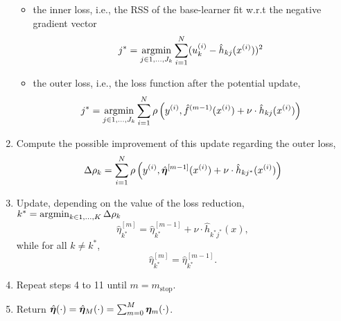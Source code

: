 \begin{algorithm}
\begin{enumerate}
\begin{itemize}
            \item the inner loss, i.e., the RSS of the base-learner fit w.r.t the negative gradient vector
                \begin{equation}
                    j^*=\operatorname*{argmin}_{j\in 1,\ldots,J_k}\sum_{i=1}^N(u_k^{(i)}-\hat{h}_{kj}(x^{(i)}))^2
                \end{equation}
            \item the outer loss, i.e., the loss function after the potential update,
                \begin{equation}
                    j^*=\operatorname*{argmin}_{j\in 1,\ldots,J_k}\sum_{i=1}^N\rho\left(y^{(i)}, \hat{f}^{(m-1)}(x^{(i)}) + \nu \cdot \hat{h}_{kj}(x^{(i)}) \right)
                \end{equation}
        \end{itemize}
    \item Compute the possible improvement of this update regarding the outer loss,
        \begin{equation}
            \Delta\rho_k=\sum_{i=1}^N\rho\left(y^{(i)}, \hat{\boldsymbol{\eta}}^{[m-1]}(x^{(i)}) + \nu \cdot \hat{h}_{kj^*}(x^{(i)}) \right)
        \end{equation}
    \item Update, depending on the value of the loss reduction, $k^*=\operatorname*{argmin}_{k\in1,\ldots,K}\Delta\rho_k$
        \begin{equation}
            \hat{\eta}^{[m]}_{k^*}=\hat{\eta}^{[m-1]}_{k^*}+\nu\cdot\hat{h}_{k^*j^*}(x),
        \end{equation}
        while for all $k\neq k^*$,
        \begin{equation}
            \hat{\eta}^{[m]}_{k^*}=\hat{\eta}^{[m-1]}_{k^*}.
        \end{equation}
    \item Repeat steps 4 to 11 until $m=m_{\text{stop}}$.
    \item Return $\hat{\boldsymbol{\eta}}(\cdot)=\hat{\boldsymbol{\eta}}_M(\cdot)=\sum_{m=0}^M\boldsymbol{\eta}_m(\cdot)$.
\end{enumerate}
\end{algorithm}


